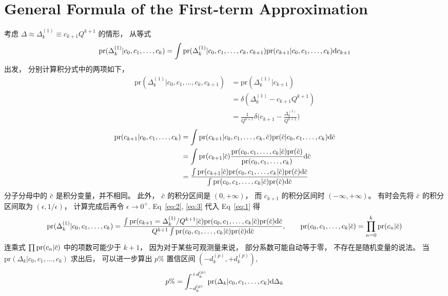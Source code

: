 \documentclass[12pt]{article}
\newcommand*\dmspr{\textrm{pr}}
\def\dmscbar{\dmsbar{c}}
\def\dmsccck{c_0,c_1,\ldots,c_k}
\def\dmsdeltako{\Delta_k^{(1)}}
\def\dmsdkp{d_k^{(p)}}
\begin{document}
\section{General Formula of the First-term Approximation}
考虑 $\Delta\approx\Delta_k^{(1)}\equiv c_{k+1}Q^{k+1}$ 的情形，
从等式
\begin{equation}
  \label{eq:1}
  \dmspr(\dmsdeltako|\dmsccck)=
  \int\dmspr(\dmsdeltako|\dmsccck,c_{k+1})
  \dmspr(c_{k+1}|\dmsccck)\mdif c_{k+1}
\end{equation}
出发，
分别计算积分式中的两项如下，
\begin{equation}
  \label{eq:2}
  \begin{aligned}
    \dmspr(\dmsdeltako|\dmsccck,c_{k+1}) &=
    \dmspr(\dmsdeltako|c_{k+1}) \\
    &= \delta(\dmsdeltako-c_{k+1}Q^{k+1})\\
    &= \frac{1}{Q^{k+1}}\delta\biggl(c_{k+1}-
    \frac{\dmsdeltako}{Q^{k+1}}\biggr)
  \end{aligned}
\end{equation}
\begin{equation}
  \label{eq:3}
  \begin{aligned}
    \dmspr(c_{k+1}|\dmsccck) &= \int\dmspr(c_{k+1}|\dmsccck,\dmscbar)
    \dmspr(\dmscbar|\dmsccck)\mdif\dmscbar \\
    &= \int\dmspr(c_{k+1}|\dmscbar) \frac{\dmspr(\dmsccck|\dmscbar)
      \dmspr(\dmscbar)}{\dmspr(\dmsccck)}\mdif\dmscbar \\
    &= \frac{\int\dmspr(c_{k+1}|\dmscbar)\dmspr(\dmsccck|\dmscbar)
      \dmspr(\dmscbar)\mdif\dmscbar}{
    \int\dmspr(\dmsccck|\dmscbar)\dmspr(\dmscbar)\mdif\dmscbar}
  \end{aligned}
\end{equation}
分子分母中的 $\dmscbar$ 是积分变量，并不相同。
此外，
$\dmscbar$ 的积分区间是 $(0,+\infty)$，
而 $c_{k+1}$ 的积分区间时 $(-\infty,+\infty)$。
有时会先将 $\dmscbar$ 的积分区间取为 $(\epsilon,1/\epsilon)$，
计算完成后再令 $\epsilon \to 0^+$.
Eq~\eqref{eq:2}, \eqref{eq:3} 代入 Eq~\eqref{eq:1} 得
\begin{equation}
  \label{eq:PrDelta}
  \dmspr(\dmsdeltako|\dmsccck)=
  \frac{\int\dmspr(c_{k+1}=\dmsdeltako/Q^{k+1}|\dmscbar)
    \dmspr(\dmsccck|\dmscbar)\dmspr(\dmscbar)\mdif\dmscbar}{
    Q^{k+1}\int\dmspr(\dmsccck|\dmscbar)\dmspr(\dmscbar)\mdif\dmscbar},
  \qquad
  \dmspr(\dmsccck|\dmscbar)=\prod_{n=0}^k\dmspr(c_n|\dmscbar)
\end{equation}
连乘式 $\prod\dmspr(c_n|\dmscbar)$ 中的项数可能少于 $k+1$，
因为对于某些可观测量来说，
部分系数可能自动等于零，
不存在是随机变量的说法。
当 $\dmspr(\Delta_k|\dmsccck)$ 求出后，
可以进一步算出 $p\%$ 置信区间 $(-\dmsdkp,+\dmsdkp)$,
\begin{equation}
  \label{eq:DOB}
  p\%=\int_{-\dmsdkp}^{+\dmsdkp}\dmspr(\Delta_k|\dmsccck)\mdif\Delta_k
\end{equation}
\end{document}
